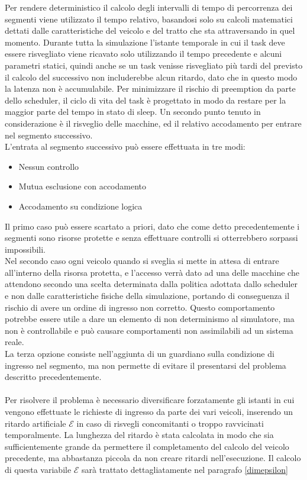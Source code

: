 Per rendere deterministico il calcolo degli intervalli di tempo di percorrenza dei segmenti viene utilizzato il tempo relativo, basandosi solo su calcoli matematici dettati dalle caratteristiche del veicolo e del tratto che sta attraversando in quel momento. Durante tutta la simulazione l’istante temporale in cui il task deve essere risvegliato viene ricavato solo utilizzando il tempo precedente e alcuni parametri statici, quindi anche se un task venisse risvegliato più tardi del previsto il calcolo del successivo non includerebbe alcun ritardo, dato che in questo modo la latenza non è accumulabile.
Per minimizzare il rischio di preemption da parte dello scheduler, il ciclo di vita del task è progettato in modo da restare per la maggior parte del tempo in stato di sleep.
Un secondo punto tenuto in considerazione è il risveglio delle macchine, ed il relativo accodamento per entrare nel segmento successivo.
\\
L'entrata al segmento successivo può essere effettuata in tre modi:
\begin{itemize}
 \item Nessun controllo
 \item Mutua esclusione con accodamento
 \item Accodamento su condizione logica
\end{itemize}
Il primo caso può essere scartato a priori, dato che come detto precedentemente i segmenti sono risorse protette e senza effettuare controlli si otterrebbero sorpassi impossibili.\\
Nel secondo caso ogni veicolo quando si sveglia si mette in attesa di entrare all’interno della risorsa protetta, e l’accesso verrà dato ad una delle macchine che attendono secondo una scelta determinata dalla politica adottata dallo scheduler e non dalle caratteristiche fisiche della simulazione, portando di conseguenza il rischio di avere un ordine di ingresso non corretto. Questo comportamento potrebbe essere utile a dare un elemento di non determinismo al simulatore, ma non è controllabile e può causare comportamenti non assimilabili ad un sistema reale. \\
La terza opzione consiste nell'aggiunta di un guardiano sulla condizione di ingresso nel segmento, ma non permette di evitare il presentarsi del problema descritto precedentemente.
\\ \\
Per risolvere il problema è necessario diversificare forzatamente gli istanti in cui vengono effettuate le richieste di ingresso da parte dei vari veicoli, inserendo un ritardo artificiale $\mathcal{E}$ in caso di risvegli concomitanti o troppo ravvicinati temporalmente. La lunghezza del ritardo è stata calcolata in modo che sia sufficientemente grande da permettere il completamento del calcolo del veicolo precedente, ma abbastanza piccola da non creare ritardi nell'esecuzione. Il calcolo di questa variabile $\mathcal{E}$ sarà trattato dettagliatamente nel paragrafo \ref{dimepsilon}

